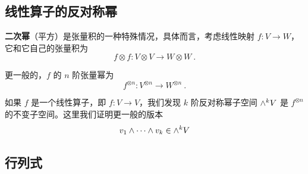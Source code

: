 
\begin{issues}
\issueDraft
{}
\end{issues}


\subsection{线性算子的反对称幂}

\textbf{二次幂}（平方）是张量积的一种特殊情况，具体而言，考虑线性映射 $f: V \to W$，它和它自己的张量积为
\begin{equation}
f \otimes f: V \otimes V \to W \otimes W~.
\end{equation}

更一般的，$f$ 的 $n$ 阶张量幂为
\begin{equation}
f^{\otimes n}: V^{\otimes n} \to W^{\otimes n}~.
\end{equation}

如果 $f$ 是一个线性算子，即 $f: V \to V$，我们发现 $k$ 阶反对称幂子空间 ${\large \wedge}^k V$ 是 $f^{\otimes n}$ 的不变子空间。这里我们证明更一般的版本
\begin{equation}
\begin{aligned}
v_1 \wedge \cdots \wedge v_k \in {\large \wedge}^k V
\end{aligned}
\end{equation}





\subsection{行列式}

